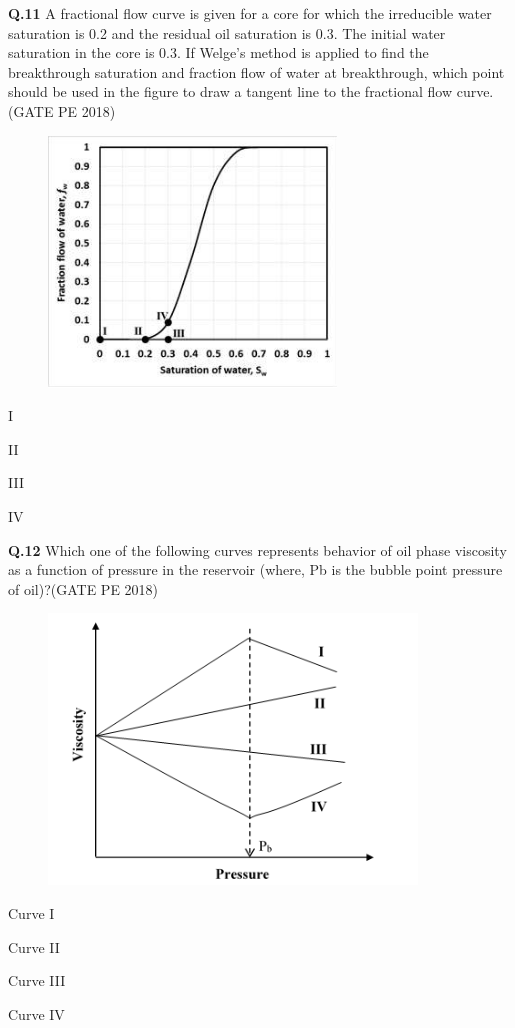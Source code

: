 \documentclass[journal,12pt,onecolumn]{IEEEtran}
\theoremstyle{remark}
\begin{document}
\noindent
\textbf{Q.11} A fractional flow curve is given for a core for which the irreducible water saturation is 0.2
and the residual oil saturation is 0.3. The initial water saturation in the core is 0.3. If
Welge’s method is applied to find the breakthrough saturation and fraction flow of water at
breakthrough, which point should be used in the figure to draw a tangent line to the
fractional flow curve.\hfill(GATE PE 2018)

\begin{figure}[h!]
  \centering
  \includegraphics[width=0.4\columnwidth]{pic6.png} 
\end{figure}

\begin{enumerate}
\begin{multicols}{4}
\item I \item II \item III \item IV
\end{multicols}
\end{enumerate}

\pagebreak

\noindent
\textbf{Q.12} Which one of the following curves represents behavior of oil phase viscosity as a function
of pressure in the reservoir (where, Pb is the bubble point pressure of oil)?\hfill(GATE PE 2018)

\begin{figure}[h!]
  \centering
  \includegraphics[width=0.6\columnwidth]{pic7.png} 
\end{figure}
\begin{enumerate}
\begin{multicols}{4}
	\item Curve I  \item Curve II \item Curve III \item Curve IV
\end{multicols}
\end{enumerate}
\end{document}
